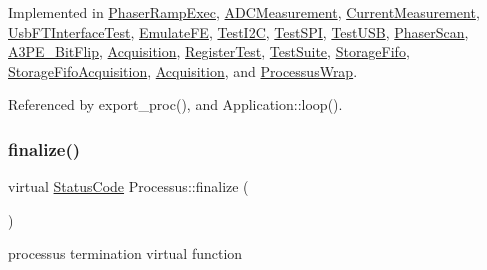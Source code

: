 Implemented in \hyperlink{classPhaserRampExec_a5fccbd3cddf738318f9d45d64b723907}{Phaser\+Ramp\+Exec}, \hyperlink{classADCMeasurement_a82de69f0488646dfc50d28f611e2010d}{A\+D\+C\+Measurement}, \hyperlink{classCurrentMeasurement_a19ae0dcc63b4151ceebe0bf2c42da948}{Current\+Measurement}, \hyperlink{classUsbFTInterfaceTest_a1e6d0b0e0c1c58238e78c5b910289b68}{Usb\+F\+T\+Interface\+Test}, \hyperlink{classEmulateFE_a5133d5b45521fc311db62d61217848b9}{Emulate\+FE}, \hyperlink{classTestI2C_aafef0778386d8a60aa5fa6067ef7ea00}{Test\+I2C}, \hyperlink{classTestSPI_afe77bfff2e5454c8b3d012721d1f0a99}{Test\+S\+PI}, \hyperlink{classTestUSB_a8c3d68e00ec4f10ec638969756a925a8}{Test\+U\+SB}, \hyperlink{classPhaserScan_abf8e9639bcbbd23ec1a9a8e04319d9d1}{Phaser\+Scan}, \hyperlink{classA3PE__BitFlip_affa7320fb39001a6e9b5696542fe4584}{A3\+P\+E\+\_\+\+Bit\+Flip}, \hyperlink{classAcquisition_ae3b63064bee1b042914b63ae4135cbd8}{Acquisition}, \hyperlink{classRegisterTest_aa1a19b0cd0e0f2d8a47913521ae259a4}{Register\+Test}, \hyperlink{classTestSuite_a531665e9bba1edb96a3ffdd421f642e2}{Test\+Suite}, \hyperlink{classStorageFifo_aa6826007c79ce353640fd1b1836807ff}{Storage\+Fifo}, \hyperlink{classStorageFifoAcquisition_a36ffcd2b9bd7ff721c4d0b638b8e4901}{Storage\+Fifo\+Acquisition}, \hyperlink{classAcquisition_a6cae797f591c2c576ebf17411e5212c9}{Acquisition}, and \hyperlink{structProcessusWrap_a099df299b3dadd548c44e7e6d94f027a}{Processus\+Wrap}.



Referenced by export\+\_\+proc(), and Application\+::loop().

\mbox{\label{classProcessus_aba93d691f031bdb18ae4b8afb1b2e856}} 
\subsubsection{\texorpdfstring{finalize()}{finalize()}}
{\footnotesize\ttfamily virtual \hyperlink{classStatusCode}{Status\+Code} Processus\+::finalize (\begin{DoxyParamCaption}{ }\end{DoxyParamCaption})\hspace{0.3cm}{\ttfamily [pure virtual]}}

processus termination virtual function 

